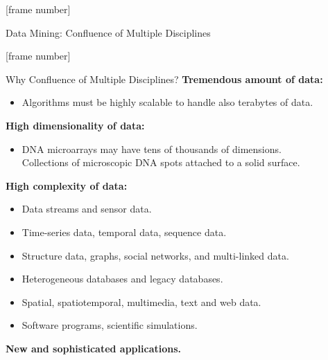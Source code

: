 \documentclass[aspectratio=169,t]{beamer}
\begin{document}
  {
    [frame number]
    \begin{frame}{Data Mining: Confluence of Multiple Disciplines}
    \centering
    \end{frame}
  }

  {
    [frame number]
    \begin{frame}{Why Confluence of Multiple Disciplines?}
    \textbf{Tremendous amount of data:}
    \begin{itemize}
        \item Algorithms must be highly scalable to handle also terabytes of data.
    \end{itemize}

    \textbf{High dimensionality of data:}
    \begin{itemize}
        \item DNA microarrays may have tens of thousands of dimensions.\\
              Collections of microscopic DNA spots attached to a solid surface.
    \end{itemize}

    \textbf{High complexity of data:}
    \begin{itemize}
        \item Data streams and sensor data.
        \item Time-series data, temporal data, sequence data.
        \item Structure data, graphs, social networks, and multi-linked data.
        \item Heterogeneous databases and legacy databases.
        \item Spatial, spatiotemporal, multimedia, text and web data.
        \item Software programs, scientific simulations.
    \end{itemize}
    \textbf{New and sophisticated applications.}
    \end{frame}
  }
\end{document}
